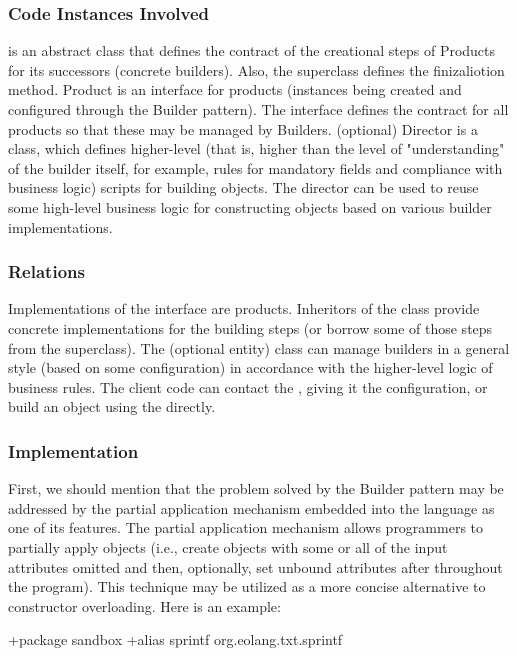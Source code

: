 \documentclass[12pt]{book}
\begin{document}
{{\subsubsection{Code Instances Involved}
 is an abstract class that defines the contract of the creational steps of Products for its successors (concrete builders). Also, the  superclass defines the finizaliotion method.
Product is an interface for products (instances being created and configured through the Builder pattern). The interface defines the contract for all products so that these may be managed by Builders.
(optional) Director is a class, which defines higher-level (that is, higher than the level of "understanding" of the builder itself, for example, rules for mandatory fields and compliance with business logic) scripts for building objects. The director can be used to reuse some high-level business logic for constructing objects based on various builder implementations.

\subsubsection{Relations}
Implementations of the  interface are products. Inheritors of the  class provide concrete implementations for the building steps (or borrow some of those steps from the superclass). The  (optional entity) class can manage builders in a general style (based on some configuration) in accordance with the higher-level logic of business rules. The client code can contact the , giving it the configuration, or build an object using the  directly.

\subsubsection{Implementation}
First, we should mention that the problem solved by the Builder pattern may be addressed by the partial application mechanism embedded into the language as one of its features. The partial application mechanism allows programmers to partially apply objects (i.e., create objects with some or all of the input attributes omitted and then, optionally, set unbound attributes after throughout the program). This technique may be utilized as a more concise alternative to constructor overloading. Here is an example:
\begin{ffcode}
+package sandbox
+alias sprintf org.eolang.txt.sprintf


\end{ffcode}}}
\end{document}
